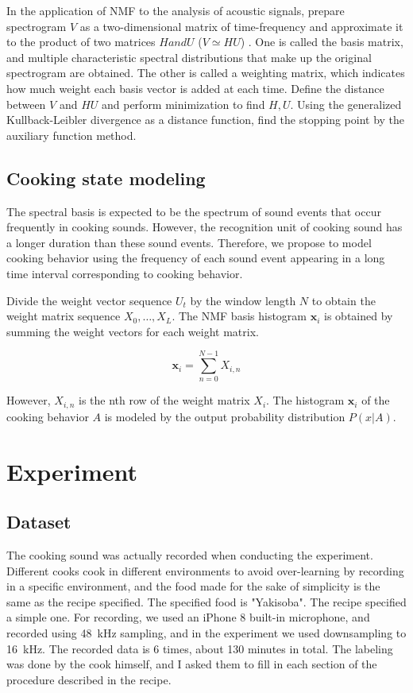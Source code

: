 \documentclass[sigchi]{acmart}
\begin{document}
In the application of NMF to the analysis of acoustic signals, prepare spectrogram $ V $ as a two-dimensional matrix of time-frequency and approximate it to the product of two matrices $ H and U $ ($ V \simeq HU $) . One is called the basis matrix, and multiple characteristic spectral distributions that make up the original spectrogram are obtained. The other is called a weighting matrix, which indicates how much weight each basis vector is added at each time. Define the distance between $ V $ and $ HU $ and perform minimization to find $ H, U $.
Using the generalized Kullback-Leibler divergence as a distance function, find the stopping point by the auxiliary function method.

\subsection{Cooking state modeling}

The spectral basis is expected to be the spectrum of sound events that occur frequently in cooking sounds. However, the recognition unit of cooking sound has a longer duration than these sound events. Therefore, we propose to model cooking behavior using the frequency of each sound event appearing in a long time interval corresponding to cooking behavior.

Divide the weight vector sequence $ {U_t} $ by the window length $ N $ to obtain the weight matrix sequence $ X_0, \ldots, X_L $.
The NMF basis histogram $ \bm{x} _i $ is obtained by summing the weight vectors for each weight matrix.

\begin{equation}
\label{hist}
	\bm{x}_i = \sum_{n=0}^{N-1} X_{i, n}
\end{equation}

However, $ X_ {i, n} $ is the nth row of the weight matrix $ X_i $.
The histogram $ \bm {x} _i $ of the cooking behavior $ A $ is modeled by the output probability distribution $ P (x | A) $.


\section{Experiment}
\subsection{Dataset}
The cooking sound was actually recorded when conducting the experiment. Different cooks cook in different environments to avoid over-learning by recording in a specific environment, and the food made for the sake of simplicity is the same as the recipe specified.
The specified food is "Yakisoba". The recipe specified a simple one.
For recording, we used an iPhone 8 built-in microphone, and recorded using \SI{48}{kHz} sampling, and in the experiment we used downsampling to \SI{16}{kHz}. The recorded data is 6 times, about 130 minutes in total.
The labeling was done by the cook himself, and I asked them to fill in each section of the procedure described in the recipe.
\end{document}
